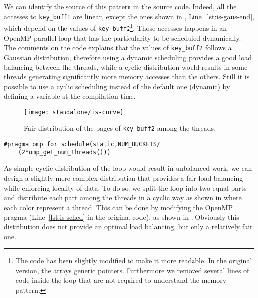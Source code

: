 We can identify the source of this pattern in the \IS source code.
Indeed, all the accesses to \texttt{key\_buff1} are linear, except the ones shown in , Line~\ref{lst:is-gaus-end}, which depend on the values of \texttt{key\_buff2}\footnote{
    The code has been slightly modified to make it more readable.
    In the original version, the arrays generic pointers.
    Furthermore we removed several lines of code inside the loop that are not required to understand the memory pattern.
    }.
Those accesses happens in an \gls{OpenMP} parallel loop that has the particularity to be scheduled dynamically.
The comments on the \IS code explains that the values of \texttt{key\_buff2} follows a Gaussian distribution, therefore using a dynamic scheduling provides a good load balancing between the threads, while a cyclic distribution would results in some threads generating significantly more memory accesses than the others.
Still it is possible to use a cyclic scheduling instead of the default one (dynamic) by defining a variable at the compilation time.

\begin{figure}[htb]
    \centering
    \texttt{[image: standalone/is-curve]}
    \caption{Fair distribution of the pages of \texttt{key\_buff2} among the threads.}
    \label{fig:is-fair}
\end{figure}

\begin{lstlisting}[caption={Modified IS code.}, label=lst:is-modif,float=htb]
#pragma omp for schedule(static,NUM_BUCKETS/
    (2*omp_get_num_threads()))
\end{lstlisting}

As simple cyclic distribution of the loop would result in unbalanced work, we can design a slightly more complex distribution that provides a fair load balancing while enforcing locality of data.
To do so, we split the loop into two equal parts and distribute each part among the threads in a cyclic way  as shown in  where each color represent a thread.
This can be done by modifying the \gls{OpenMP} pragma (Line~\ref{lst:is-sched} in the original code), as shown in .
Obviously this distribution does not provide an optimal load balancing, but only a relatively fair one.


